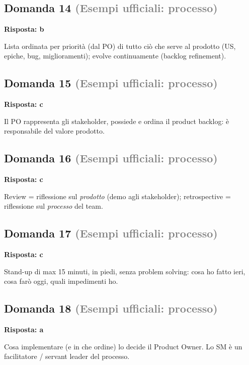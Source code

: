 \documentclass[a4paper,11pt]{article}
\begin{document}
\subsection*{Domanda 14 \hfill {\small \textcolor{gray}{(Esempi ufficiali: processo)}}}
\textbf{Risposta: b}\par
Lista ordinata per priorità (dal PO) di tutto ciò che serve al prodotto (US, epiche, bug, miglioramenti); evolve continuamente (backlog refinement).



\subsection*{Domanda 15 \hfill {\small \textcolor{gray}{(Esempi ufficiali: processo)}}}
\textbf{Risposta: c}\par
Il PO rappresenta gli stakeholder, possiede e ordina il product backlog: è responsabile del valore prodotto.



\subsection*{Domanda 16 \hfill {\small \textcolor{gray}{(Esempi ufficiali: processo)}}}
\textbf{Risposta: c}\par
Review = riflessione sul \textit{prodotto} (demo agli stakeholder); retrospective = riflessione sul \textit{processo} del team.



\subsection*{Domanda 17 \hfill {\small \textcolor{gray}{(Esempi ufficiali: processo)}}}
\textbf{Risposta: c}\par
Stand-up di max 15 minuti, in piedi, senza problem solving: cosa ho fatto ieri, cosa farò oggi, quali impedimenti ho.



\subsection*{Domanda 18 \hfill {\small \textcolor{gray}{(Esempi ufficiali: processo)}}}
\textbf{Risposta: a}\par
Cosa implementare (e in che ordine) lo decide il Product Owner. Lo SM è un facilitatore / servant leader del processo.
\end{document}
